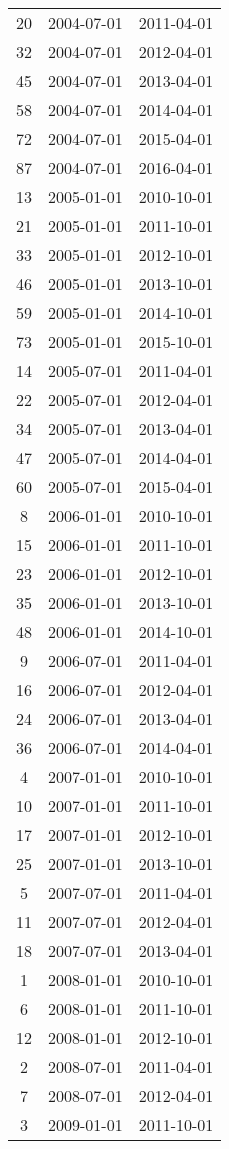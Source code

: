 \begin{tabular}{ccc}
  20 & 2004-07-01 & 2011-04-01 \\ 
  32 & 2004-07-01 & 2012-04-01 \\ 
  45 & 2004-07-01 & 2013-04-01 \\ 
  58 & 2004-07-01 & 2014-04-01 \\ 
  72 & 2004-07-01 & 2015-04-01 \\ 
  87 & 2004-07-01 & 2016-04-01 \\ 
  13 & 2005-01-01 & 2010-10-01 \\ 
  21 & 2005-01-01 & 2011-10-01 \\ 
  33 & 2005-01-01 & 2012-10-01 \\ 
  46 & 2005-01-01 & 2013-10-01 \\ 
  59 & 2005-01-01 & 2014-10-01 \\ 
  73 & 2005-01-01 & 2015-10-01 \\ 
  14 & 2005-07-01 & 2011-04-01 \\ 
  22 & 2005-07-01 & 2012-04-01 \\ 
  34 & 2005-07-01 & 2013-04-01 \\ 
  47 & 2005-07-01 & 2014-04-01 \\ 
  60 & 2005-07-01 & 2015-04-01 \\ 
  8 & 2006-01-01 & 2010-10-01 \\ 
  15 & 2006-01-01 & 2011-10-01 \\ 
  23 & 2006-01-01 & 2012-10-01 \\ 
  35 & 2006-01-01 & 2013-10-01 \\ 
  48 & 2006-01-01 & 2014-10-01 \\ 
  9 & 2006-07-01 & 2011-04-01 \\ 
  16 & 2006-07-01 & 2012-04-01 \\ 
  24 & 2006-07-01 & 2013-04-01 \\ 
  36 & 2006-07-01 & 2014-04-01 \\ 
  4 & 2007-01-01 & 2010-10-01 \\ 
  10 & 2007-01-01 & 2011-10-01 \\ 
  17 & 2007-01-01 & 2012-10-01 \\ 
  25 & 2007-01-01 & 2013-10-01 \\ 
  5 & 2007-07-01 & 2011-04-01 \\ 
  11 & 2007-07-01 & 2012-04-01 \\ 
  18 & 2007-07-01 & 2013-04-01 \\ 
  1 & 2008-01-01 & 2010-10-01 \\ 
  6 & 2008-01-01 & 2011-10-01 \\ 
  12 & 2008-01-01 & 2012-10-01 \\ 
  2 & 2008-07-01 & 2011-04-01 \\ 
  7 & 2008-07-01 & 2012-04-01 \\ 
  3 & 2009-01-01 & 2011-10-01 \\ 
   \hline
\end{tabular}
